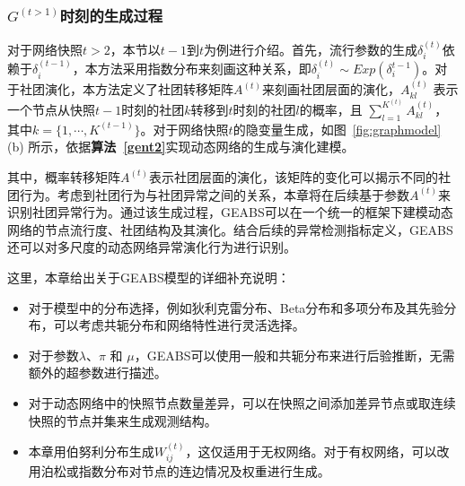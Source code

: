 \subsubsection{$G^{(t>1)}$时刻的生成过程}

对于网络快照$t > 2$，本节以$t-1$到$t$为例进行介绍。首先，流行参数的生成$\delta_i^{(t)}$依赖于$\delta_i^{(t-1)}$，本方法采用指数分布来刻画这种关系，即$\delta_i^{(t)} \sim Exp(\delta_i^{t-1})$。对于社团演化，本方法定义了社团转移矩阵$A^{(t)}$来刻画社团层面的演化，$A^{(t)}_{kl}$ 表示一个节点从快照$t-1$时刻的社团$k$转移到$t$时刻的社团$l$的概率，且 $\sum_{l=1}^{K^{(t)}}A^{(t)}_{kl}$，其中$k =\{1, \cdots, K^{(t-1)}\}$。对于网络快照$t$的隐变量生成，如图~\ref{fig:graphmodel} (b) 所示，依据\textbf{算法~\ref{gent2}}实现动态网络的生成与演化建模。

其中，概率转移矩阵$A^{(t)}$表示社团层面的演化，该矩阵的变化可以揭示不同的社团行为。考虑到社团行为与社团异常之间的关系，本章将在后续基于参数$A^{(t)}$来识别社团异常行为。通过该生成过程，GEABS可以在一个统一的框架下建模动态网络的节点流行度、社团结构及其演化。结合后续的异常检测指标定义，GEABS还可以对多尺度的动态网络异常演化行为进行识别。

这里，本章给出关于GEABS模型的详细补充说明：
\begin{itemize}
    \item 对于模型中的分布选择，例如狄利克雷分布、Beta分布和多项分布及其先验分布，可以考虑共轭分布和网络特性进行灵活选择。
    \item  对于参数$\lambda$、$\pi$ 和 $\mu$，GEABS可以使用一般和共轭分布来进行后验推断，无需额外的超参数进行描述。
    \item  对于动态网络中的快照节点数量差异，可以在快照之间添加差异节点或取连续快照的节点并集来生成观测结构。
    \item  本章用伯努利分布生成$W^{(t)}_{ij}$，这仅适用于无权网络。对于有权网络，可以改用泊松或指数分布对节点的连边情况及权重进行生成。
\end{itemize}


